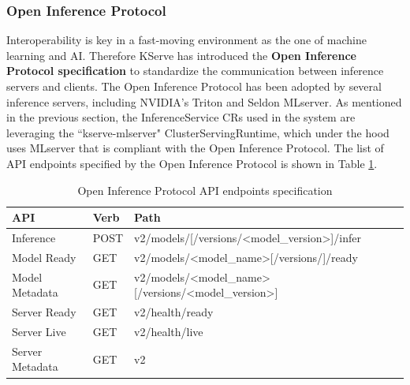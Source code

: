 \subsubsection{Open Inference Protocol}

Interoperability is key in a fast-moving environment as the one of machine learning and AI. 
Therefore KServe has introduced the \textbf{Open Inference Protocol specification} to standardize the communication between inference servers and clients. 
The Open Inference Protocol has been adopted by several inference servers, including NVIDIA's Triton and Seldon MLserver.
As mentioned in the previous section, the InferenceService CRs used in the system are leveraging the ``kserve-mlserver" ClusterServingRuntime, which under the hood uses MLserver that is compliant with the Open Inference Protocol.
The list of API endpoints specified by the Open Inference Protocol is shown in Table \ref{tab:oip_endpoints}.


\begin{table}[h!]
\centering
\begin{tabular}{|l|l|l|}
\hline
\textbf{API}    & \textbf{Verb} & \textbf{Path}                                                                                         \\ \hline
Inference       & POST          & v2/models/{[}/versions/\textless{}model\_version\textgreater{}{]}/infer                               \\ \hline
Model Ready     & GET           & v2/models/\textless{}model\_name\textgreater{}{[}/versions/{]}/ready                                  \\ \hline
Model Metadata  & GET           & v2/models/\textless{}model\_name\textgreater{}{[}/versions/\textless{}model\_version\textgreater{}{]} \\ \hline
Server Ready    & GET           & v2/health/ready                                                                                       \\ \hline
Server Live     & GET           & v2/health/live                                                                                        \\ \hline
Server Metadata & GET           & v2                                                                                                    \\ \hline
\end{tabular}
\caption{Open Inference Protocol API endpoints specification}
\label{tab:oip_endpoints}
\end{table}

